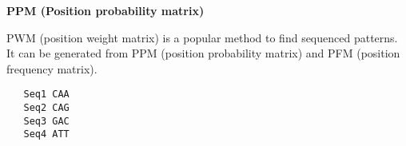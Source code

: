 \question \textbf{PPM (Position probability matrix)}

PWM (position weight matrix) is a popular method to find sequenced patterns. It can be generated from PPM (position probability matrix) and PFM (position frequency matrix).

\begin{verbatim}
   Seq1 CAA
   Seq2 CAG
   Seq3 GAC
   Seq4 ATT
\end{verbatim}

\vspace{0.1 in}


